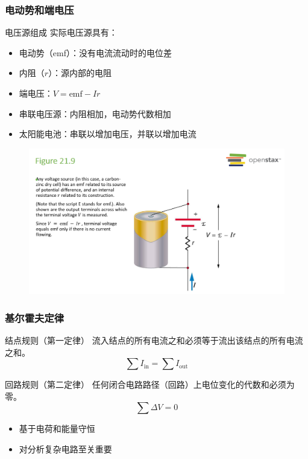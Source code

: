 \documentclass{beamer}
\begin{document}
\begin{frame}
    \frametitle{电动势和端电压}
    \begin{block}{电压源组成}
        实际电压源具有：
        \begin{itemize}
            \item 电动势（emf）：没有电流流动时的电位差
            \item 内阻（$r$）：源内部的电阻
        \end{itemize}
    \end{block}
    \begin{itemize}
        \item 端电压：$V = \text{emf} - Ir$
        \item 串联电压源：内阻相加，电动势代数相加
        \item 太阳能电池：串联以增加电压，并联以增加电流
    \end{itemize}
\end{frame}
\begin{frame}
    \begin{figure}
        \centering
        \includegraphics[width=1\linewidth]{phys12-circuits-internal-resistance.png}
    \end{figure}
\end{frame}
\begin{frame}
    \frametitle{基尔霍夫定律}
    \begin{block}{结点规则（第一定律）}
        流入结点的所有电流之和必须等于流出该结点的所有电流之和。
        \[ \sum I_{\text{in}} = \sum I_{\text{out}} \]
    \end{block}
    \begin{block}{回路规则（第二定律）}
        任何闭合电路路径（回路）上电位变化的代数和必须为零。
        \[ \sum \Delta V = 0 \]
    \end{block}
    \begin{itemize}
        \item 基于电荷和能量守恒
        \item 对分析复杂电路至关重要
    \end{itemize}
\end{frame}
\end{document}
